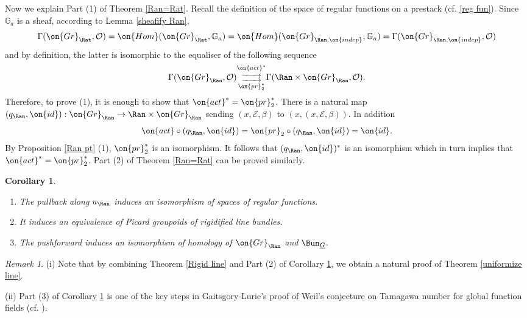 \documentclass[]{pcmi}
\theoremstyle{plain}
\newtheorem{cor}[equation]{Corollary}
\theoremstyle{remark}
\newtheorem{rmk}[equation]{Remark}
\theoremstyle{definition}
\newcommand{\bG}{{\mathbb G}}
\newcommand{\mE}{{\mathcal E}}
\newcommand{\mO}{{\mathcal O}}
\newcommand{\Gr}{{\on{Gr}}}
\newcommand{\Hom}{{\on{Hom}}}
\newcommand{\id}{{\on{id}}}
\newcommand{\pr}{{\on{pr}}}
\begin{document}
Now we explain Part (1) of Theorem \ref{Ran=Rat}. Recall the definition of the space of regular functions on a prestack (cf. \eqref{reg fun}). Since $\bG_a$ is a sheaf, according to Lemma \ref{sheafify Ran}, 
$$\Gamma(\Gr_{\Rat},\mO)=\Hom(\Gr_{\Rat},\bG_a)=\Hom(\Gr_{\Ran,\on{indep}},\bG_a)=\Gamma(\Gr_{\Ran,\on{indep}},\mO)$$
and by definition, the latter is isomorphic to the equaliser of the following sequence
\[\Gamma(\Gr_{\Ran},\mO)\substack{\on{act}^*\\  \xrightarrow{\hspace*{.6cm}}\\[-0.6ex] \xrightarrow{\hspace*{.6cm}} \\ \pr_2^*} \Gamma(\Ran\times \Gr_{\Ran},\mO).\]
Therefore, to prove (1), it is enough to show that $\on{act}^*=\pr_2^*$. There is a natural map $(q_{\Ran},\id):\Gr_{\Ran}\to \Ran\times\Gr_{\Ran}$ sending $(x,\mE,\beta)$ to $(x,(x,\mE,\beta))$. In addition
\[ \on{act}\circ(q_{\Ran},\id)=\pr_2\circ(q_{\Ran},\id)=\id.\]
By Proposition \ref{Ran pt} (1), $\pr_2^*$ is an isomorphism. It follows that $(q_{\Ran},\id)^*$ is an isomorphism which in turn implies that $\on{act}^*=\pr_2^*$. Part (2) of Theorem \ref{Ran=Rat} can be proved similarly.





\begin{cor}\label{Gr=Bun}~
\begin{enumerate}
\item The pullback along $u_{\Ran}$ induces an isomorphism of spaces of regular functions. 

\item It induces an equivalence of Picard groupoids of rigidified line bundles. 

\item The pushforward induces an isomorphism of homology of $\Gr_{\Ran}$ and $\Bun_{\underline G}$.
\end{enumerate}
\end{cor}

\begin{rmk}
(i) Note that by combining Theorem \ref{Rigid line} and Part (2) of Corollary \ref{Gr=Bun}, we obtain a natural proof of Theorem \ref{uniformize line}.

(ii) Part (3) of Corollary \ref{Gr=Bun} is one of the key steps in Gaitsgory-Lurie's proof of Weil's conjecture on Tamagawa number for global function fields (cf. \cite{GL}).
\end{rmk}
\end{document}
